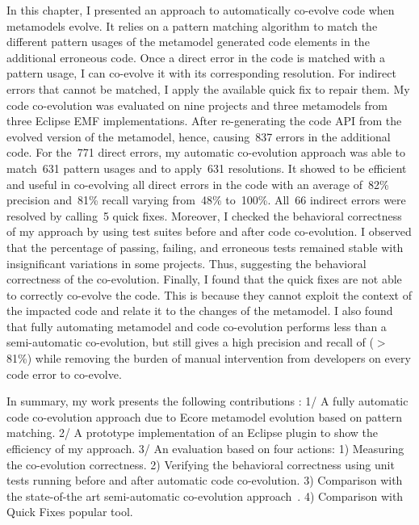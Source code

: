 In this chapter, I presented an approach to automatically co-evolve code when metamodels evolve. It relies on a pattern matching algorithm to match the different pattern usages of the metamodel generated code elements in the additional erroneous code. Once a direct error in the code is matched with a pattern usage, I can co-evolve it with its corresponding resolution. 
For indirect errors that cannot be matched, I apply the available quick fix to repair them. 
%
My code co-evolution was evaluated on nine projects and three metamodels from three Eclipse EMF implementations. After re-generating the code API from the evolved version of the metamodel, hence, causing~837 errors in the additional code.
For the~771 direct errors, my automatic co-evolution approach was able to match~631 pattern usages and to apply~631 resolutions. It showed to be efficient and useful in co-evolving all direct errors in the code with an average of~82\% precision and~81\% recall varying from~48\% to~100\%. All~66 indirect errors were resolved by calling~5 quick fixes. Moreover, I checked the behavioral correctness of my approach by using test suites before and after code co-evolution. I observed that the percentage of passing, failing, and erroneous tests remained stable with insignificant variations in some projects. Thus, suggesting the behavioral correctness of the co-evolution. Finally, I found that the quick fixes are not able to correctly co-evolve the code. This is because they cannot exploit the context of the impacted code and relate it to the changes of the metamodel. 
I also found that fully automating metamodel and code co-evolution performs less than a semi-automatic co-evolution, but still gives a high precision and recall of ($>$ 81\%) while removing the burden of manual intervention from developers on every code error to co-evolve.

In summary, my work presents the following contributions :
1/ A fully automatic code co-evolution approach due to Ecore metamodel evolution based on pattern matching. 
2/ A prototype implementation of an Eclipse plugin to show the efficiency of my approach. %
3/ An evaluation based on four actions: 1) Measuring the co-evolution correctness. 2) Verifying the behavioral correctness using unit tests running before and after automatic code co-evolution. 3) Comparison with the state-of-the art semi-automatic co-evolution approach~\cite{Khelladi2020}. 4) Comparison with Quick Fixes popular tool.

